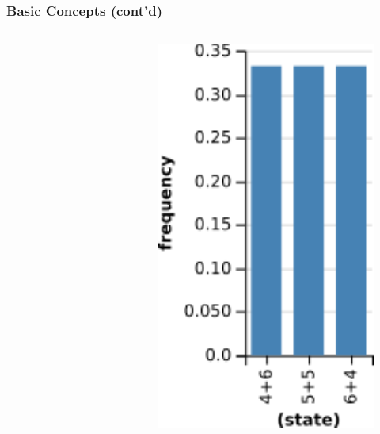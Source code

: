 \documentclass[usenames,dvipsnames]{beamer}
\begin{document}
\begin{frame}[fragile]
  \frametitle{Basic Concepts (cont'd)}
  \begin{columns}[t]
    \begin{column}{.65\textwidth}
      \inputminted[fontsize=\fontsize{7}{7}\selectfont]{js}{src/roll10.wppl}
    \end{column}
    \begin{column}{.31\textwidth}
      \begin{figure}[ht]
        \centering
        \includegraphics[width=1\textwidth,height=0.6\textheight]{figures/roll10.png}
        \caption*{\label{fig:roll10}}
      \end{figure}
    \end{column}
  \end{columns}
\end{frame}
\end{document}
